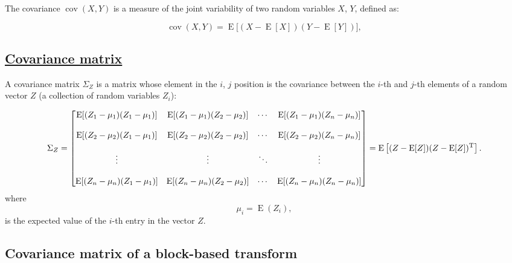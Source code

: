 The covariance \(\operatorname{cov}(X,Y)\) is a measure of the joint
variability of two random variables \(X\), \(Y\), defined as:

\begin{equation}
  \operatorname{cov}(X,Y) = \operatorname{E}{\big[(X - \operatorname{E}[X])(Y - \operatorname{E}[Y])\big]},
\end{equation}

    \hypertarget{covariance-matrix}{%
\subsection{\texorpdfstring{\href{https://en.wikipedia.org/wiki/Covariance_matrix}{Covariance
matrix}}{Covariance matrix}}\label{covariance-matrix}}

A covariance matrix \(\Sigma_Z\) is a matrix whose element in the \(i\),
\(j\) position is the covariance between the \(i\)-th and \(j\)-th
elements of a random vector \(Z\) (a collection of random variables
\(Z_i\)):

\begin{equation}
  \Sigma_Z =
    \begin{bmatrix}
       \operatorname{E}[(Z_1 - \mu_1)(Z_1 - \mu_1)] & \operatorname{E}[(Z_1 - \mu_1)(Z_2 - \mu_2)] & \cdots & \operatorname{E}[(Z_1 - \mu_1)(Z_n - \mu_n)] \\ \\
       \operatorname{E}[(Z_2 - \mu_2)(Z_1 - \mu_1)] & \operatorname{E}[(Z_2 - \mu_2)(Z_2 - \mu_2)] & \cdots & \operatorname{E}[(Z_2 - \mu_2)(Z_n - \mu_n)] \\ \\
       \vdots & \vdots & \ddots & \vdots \\ \\
       \operatorname{E}[(Z_n - \mu_n)(Z_1 - \mu_1)] & \operatorname{E}[(Z_n - \mu_n)(Z_2 - \mu_2)] & \cdots & \operatorname{E}[(Z_n - \mu_n)(Z_n - \mu_n)]
    \end{bmatrix} =
    \operatorname{E}
    \left[
       (Z - \operatorname{E}[Z])
       (Z - \operatorname{E}[Z])^{\rm T}
    \right].
\end{equation} where \begin{equation}
  \mu_i = \operatorname{E}(Z_i),
\end{equation} is the expected value of the \(i\)-th entry in the vector
\(Z\).

    \hypertarget{covariance-matrix-of-a-block-based-transform}{%
\subsection{Covariance matrix of a block-based
transform}\label{covariance-matrix-of-a-block-based-transform}}

